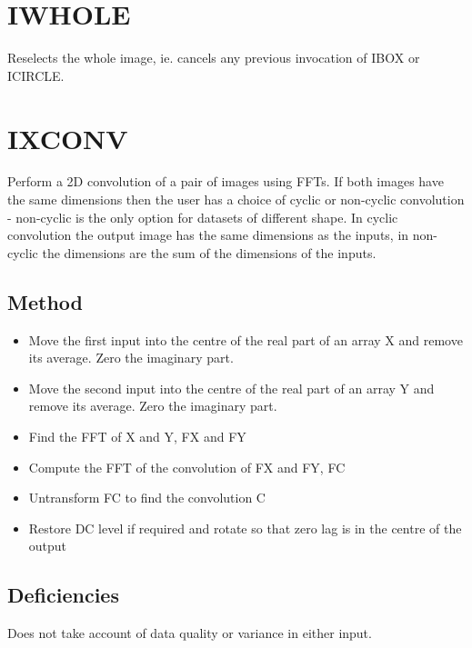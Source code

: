 \documentclass{book}
\renewcommand{\_}{{\tt\char'137}}     %
\begin{document}
\section{IWHOLE}
Reselects the whole image, ie. cancels any previous invocation of
IBOX or ICIRCLE.

\section{IXCONV}
Perform a 2D convolution of a pair of images using FFTs. If both
images have the same dimensions then the user has a choice of
cyclic or non-cyclic convolution - non-cyclic is the only option
for datasets of different shape. In cyclic convolution the output
image has the same dimensions as the inputs, in non-cyclic the
dimensions are the sum of the dimensions of the inputs.

\subsection{Method}
\begin{itemize}
\item Move the first input into the centre of the real part of an array X
and remove its average. Zero the imaginary part.
\item Move the second input into the centre of the real part of an array Y
and remove its average. Zero the imaginary part.
\item Find the FFT of X and Y, FX and FY
\item Compute the FFT of the convolution of FX and FY, FC
\item Untransform FC to find the convolution C
\item Restore DC level if required and rotate so that zero lag is in the
centre of the output
\end{itemize}
\subsection{Deficiencies}
Does not take account of data quality or variance in either input.
\end{document}
